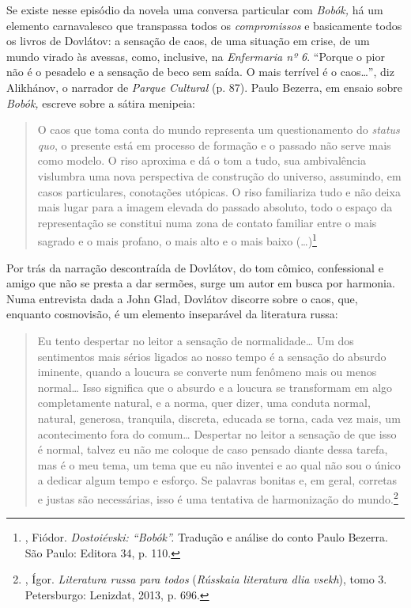 Se existe nesse episódio da novela uma conversa particular com
\emph{Bobók,} há um elemento carnavalesco que transpassa todos os
\emph{compromissos} e basicamente todos os livros de Dovlátov: a
sensação de caos, de uma situação em crise, de um mundo virado às
avessas, como, inclusive, na \emph{Enfermaria nº 6}. ``Porque o pior não
é o pesadelo e a sensação de beco sem saída. O mais terrível é o
caos\ldots{}'', diz Alikhánov, o narrador de \emph{Parque Cultural} (p. 87).
Paulo Bezerra, em ensaio sobre \emph{Bobók,} escreve sobre a sátira
menipeia:

\begin{quotation}
O caos que toma conta do mundo representa um questionamento do
\emph{status quo}, o presente está em processo de formação e o passado
não serve mais como modelo. O riso aproxima e dá o tom a tudo, sua
ambivalência vislumbra uma nova perspectiva de construção do universo,
assumindo, em casos particulares, conotações utópicas. O riso
familiariza tudo e não deixa mais lugar para a imagem elevada do passado
absoluto, todo o espaço da representação se constitui numa zona de
contato familiar entre o mais sagrado e o mais profano, o mais alto e o
mais baixo (\ldots{})\footnote{, Fiódor. \emph{Dostoiévski:
  ``Bobók''.} Tradução e análise do conto Paulo Bezerra. São Paulo:
  Editora 34, p. 110.}
\end{quotation}

Por trás da narração descontraída de Dovlátov, do tom cômico,
confessional e amigo que não se presta a dar sermões, surge um autor em
busca por harmonia. Numa entrevista dada a John Glad, Dovlátov discorre
sobre o caos, que, enquanto cosmovisão, é um elemento inseparável da
literatura russa:

\begin{quotation}
Eu tento despertar no leitor a sensação de normalidade\ldots{} Um dos
sentimentos mais sérios ligados ao nosso tempo é a sensação do absurdo
iminente, quando a loucura se converte num fenômeno mais ou menos
normal\ldots{} Isso significa que o absurdo e a loucura se transformam em
algo completamente natural, e a norma, quer dizer, uma conduta normal,
natural, generosa, tranquila, discreta, educada se torna, cada vez mais,
um acontecimento fora do comum\ldots{} Despertar no leitor a sensação de que
isso é normal, talvez eu não me coloque de caso pensado diante dessa
tarefa, mas é o meu tema, um tema que eu não inventei e ao qual não sou
o único a dedicar algum tempo e esforço. Se palavras bonitas e, em
geral, corretas e justas são necessárias, isso é uma tentativa de
harmonização do mundo.\footnote{, Ígor. \emph{Literatura russa
  para todos} (\emph{Rússkaia literatura dlia vsekh}), tomo 3.
  Petersburgo: Lenizdat, 2013, p. 696.}
\end{quotation}

